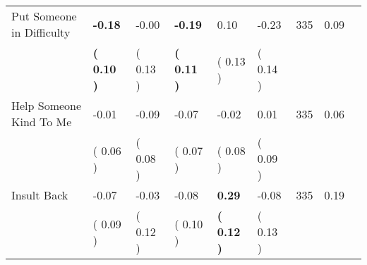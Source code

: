 \begin{tabular}{L{6.2cm} C{1.8cm} C{1.8cm} C{1.8cm} C{1.8cm} C{1.8cm} C{1.8cm} C{0.3cm} C{0.3cm}}
Put Someone in Difficulty & \textbf{    -0.18} &     -0.00 & \textbf{    -0.19} &      0.10 &     -0.23  & 335 &       0.09 \\ 
 & \textbf{(     0.10 )} & (     0.13 ) & \textbf{(     0.11 )} & (     0.13 ) & (     0.14 )  & \\
Help Someone Kind To Me &     -0.01 &     -0.09 &     -0.07 &     -0.02 &      0.01  & 335 &       0.06 \\ 
 & (     0.06 ) & (     0.08 ) & (     0.07 ) & (     0.08 ) & (     0.09 )  & \\
Insult Back &     -0.07 &     -0.03 &     -0.08 & \textbf{     0.29} &     -0.08  & 335 &       0.19 \\ 
 & (     0.09 ) & (     0.12 ) & (     0.10 ) & \textbf{(     0.12 )} & (     0.13 )  & \\
\bottomrule
\end{tabular}
